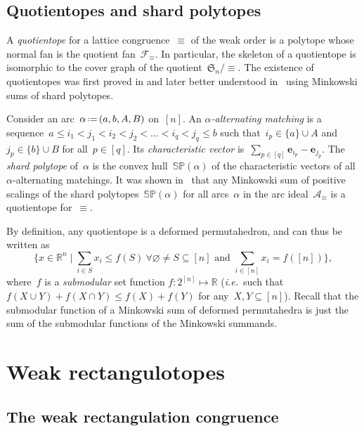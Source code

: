 \documentclass{amsart}
\theoremstyle{definition}
\newcommand{\R}{\mathbb{R}} %
\renewcommand{\c}[1]{\mathcal{#1}} %
\renewcommand{\b}[1]{{\boldsymbol{#1}}} %
\newcommand{\f}[1]{\mathfrak{#1}} %
\newcommand{\Bigset}[2]{\Big\{ #1 \;\Big|\; #2 \Big\}} %
\newcommand{\eqdef}{\mbox{\,\raisebox{0.2ex}{\scriptsize\ensuremath{\mathrm:}}\ensuremath{=}\,}} %
\newcommand{\ie}{\textit{i.e.}~} %
\newcommand{\darkblue}{\color{darkblue}} %
\newcommand{\defn}[1]{\textsl{\darkblue #1}} %
\newcommand{\polytope}[1]{\mathds{#1}} %
\newcommand{\SP}{\polytope{SP}}
\begin{document}
\subsection{Quotientopes and shard polytopes}

A \defn{quotientope} for a lattice congruence~$\equiv$ of the weak order is a polytope whose normal fan is the quotient fan~$\c{F}_\equiv$.
In particular, the skeleton of a quotientope is isomorphic to the cover graph of the quotient~$\f{S}_n/{\equiv}$.
The existence of quotientopes was first proved in \cite{PilaudSantos} and later better understood in~\cite{PadrolPilaudRitter} using Minkowski sums of shard polytopes.

Consider an arc~$\alpha \eqdef (a, b, A, B)$ on~$[n]$.
An \defn{$\alpha$-alternating matching} is a sequence~$a \le i_1 < j_1 < i_2 < j_2 < \dots < i_q < j_q \le b$ such that~$i_p \in \{a\} \cup A$ and~$j_p \in \{b\} \cup B$ for all~$p \in [q]$.
Its \defn{characteristic vector} is~$\sum_{p \in [q]} \b{e}_{i_p} - \b{e}_{j_p}$.
The \defn{shard polytope} of~$\alpha$ is the convex hull~$\SP(\alpha)$ of the characteristic vectors of all $\alpha$-alternating matchings.
It was shown in~\cite{PadrolPilaudRitter} that any Minkowski sum of positive scalings of the shard polytopes~$\SP(\alpha)$ for all arcs~$\alpha$ in the arc ideal~$\c{A}_\equiv$ is a quotientope for~$\equiv$.

By definition, any quotientope is a deformed permutahedron, and can thus be written as
  \[
  \Bigset{x \in \R^n}{\sum_{i \in S} x_i \le f(S)\ \forall \varnothing \ne S \subseteq [n] \text { and } \sum_{i \in [n]} x_i = f([n])},
  \]
where~$f$ is a \defn{submodular} set function $f:2^{[n]}\mapsto \R$ (\ie such that~$f(X \cup Y) + f(X \cap Y) \le f(X) + f(Y)$ for any~$X, Y \subseteq [n]$).
Recall that the submodular function of a Minkowski sum of deformed permutahedra is just the sum of the submodular functions of the Minkowski summands.


\section{Weak rectangulotopes}
\label{sec:wr}


\subsection{The weak rectangulation congruence}
\end{document}
